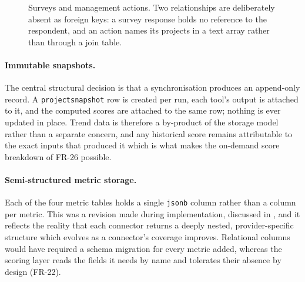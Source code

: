 \begin{figure}[htbp]
\caption{Surveys and management actions. Two relationships are deliberately
absent as foreign keys: a survey response holds no reference to the respondent,
and an action names its projects in a text array rather than through a join
table.}
\label{fig:erd-engagement}
\end{figure}

\paragraph{Immutable snapshots.}
The central structural decision is that a synchronisation produces an
append-only record. A \texttt{projectsnapshot} row is created per run, each
tool's output is attached to it, and the computed scores are attached to the same
row; nothing is ever updated in place. Trend data is therefore a by-product of
the storage model rather than a separate concern, and any historical score
remains attributable to the exact inputs that produced it which is what makes
the on-demand score breakdown of FR-26 possible.

\paragraph{Semi-structured metric storage.}
Each of the four metric tables holds a single \texttt{jsonb} column rather than a
column per metric. This was a revision made during implementation, discussed in
, and it reflects the reality that each connector
returns a deeply nested, provider-specific structure which evolves as a
connector's coverage improves. Relational columns would have required a schema
migration for every metric added, whereas the scoring layer reads the fields it
needs by name and tolerates their absence by design (FR-22).

